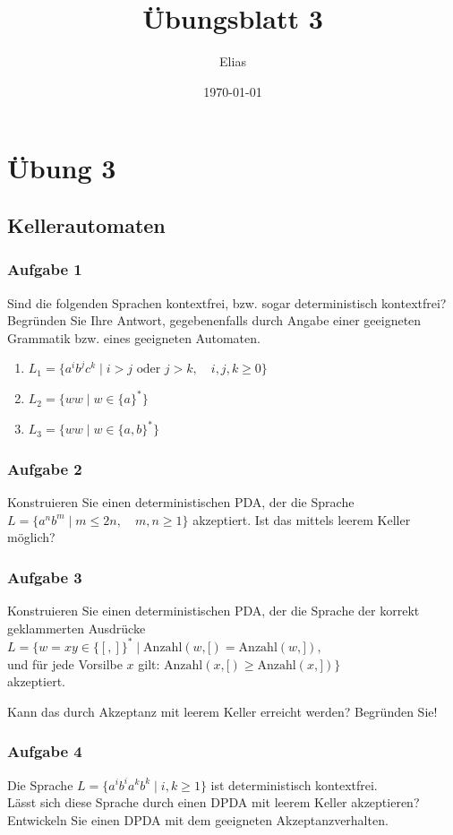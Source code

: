 \documentclass[a4paper,14pt,ngerman]{scrartcl}
\author{Elias}
\date{\today}
\title{Übungsblatt 3}
\begin{document}
\section{\textbf{Übung 3}}
\label{sec:org39b8294}
\subsection{\textbf{Kellerautomaten}}
\label{sec:org3d7aeb6}
\subsubsection{\textbf{Aufgabe 1}}
\label{sec:orgd5e8908}

Sind die folgenden Sprachen kontextfrei, bzw. sogar deterministisch
kontextfrei? Begründen Sie Ihre Antwort, gegebenenfalls durch Angabe
einer geeigneten Grammatik bzw. eines geeigneten Automaten.

\begin{enumerate}
\item \(L_1=\{a^ib^jc^k \mid i>j \textrm{ oder } j>k,\quad i,j,k\geq 0\}\)

\item \(L_2=\{ww \mid w\in \{a\}^*\}\)

\item \(L_3=\{ww \mid w\in \{a,b\}^*\}\)
\end{enumerate}
\subsubsection{\textbf{Aufgabe 2}}
\label{sec:org76f6a58}

Konstruieren Sie einen deterministischen PDA, der die Sprache\\
\(L=\{a^nb^m \mid m \leq 2n, \quad m,n\geq 1\}\) akzeptiert. Ist das
mittels leerem Keller möglich?
\subsubsection{\textbf{Aufgabe 3}}
\label{sec:org333edd8}

Konstruieren Sie einen deterministischen PDA, der die Sprache der
korrekt geklammerten Ausdrücke\\
\(L=\{w=xy \in \{[,]\}^* \mid \textrm{Anzahl}(w,[)=\textrm{Anzahl}(w,]),\)\\
und für jede Vorsilbe \(x\) gilt:
\(\textrm{Anzahl}(x,[)\geq\textrm{Anzahl}(x,])\}\)\\
akzeptiert.

Kann das durch Akzeptanz mit leerem Keller erreicht werden? Begründen
Sie!
\subsubsection{\textbf{Aufgabe 4}}
\label{sec:org1259c3e}

Die Sprache \(L=\{a^ib^ia^kb^k \mid i,k\geq 1\}\) ist deterministisch
kontextfrei.\\
Lässt sich diese Sprache durch einen DPDA mit leerem Keller
akzeptieren?\\
Entwickeln Sie einen DPDA mit dem geeigneten Akzeptanzverhalten.
\end{document}
